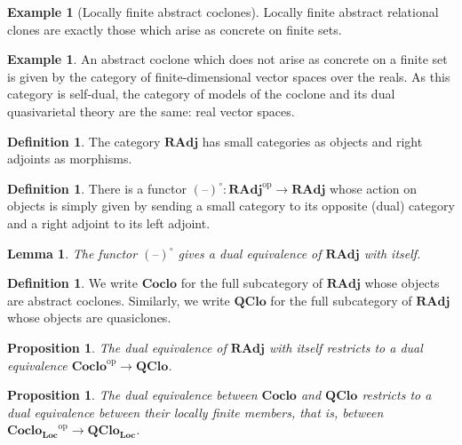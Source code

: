 \documentclass[11pt, a4paper, twoside,leqno]{amsart}
\newcommand{\cat}[1]{\mathbf{#1}}
\newcommand{\thg}{{\mathord{\text{--}}}}
\numberwithin{equation}{section}
\theoremstyle{plain}
\newtheorem{Prop}[Thm]{Proposition}
\newtheorem{Lemma}[Thm]{Lemma}
\theoremstyle{definition}
\newtheorem{Defn}[Thm]{Definition}
\newtheorem{Ex}[Thm]{Example}
\begin{document}
\begin{Ex}[Locally finite abstract coclones]
  \label{ex:loc-fin-arc}
  Locally finite abstract relational clones are exactly those which
  arise as concrete on finite sets. 
\end{Ex}

\begin{Ex}%
  \label{ex:vector-space}
  An abstract coclone which does not arise as 
  concrete on a finite set is given by the category
  of finite-dimensional vector spaces over the reals. As this category
  is self-dual, the category of models of the coclone and its
  dual quasivarietal theory are the same: real vector spaces. 
\end{Ex}


\begin{Defn}
  \label{def:rad-cat}
  The category \(\cat{RAdj}\) has small categories as objects and right
  adjoints as morphisms.
\end{Defn}

\begin{Defn}
  \label{def:func-o}
  There is a functor \((\thg)^{\circ} \colon \cat{RAdj} ^{\mathrm{op}} \rightarrow \cat{RAdj}\) whose
  action on objects is simply given by sending a small category to its
  opposite (dual) category and a right adjoint to its left adjoint.
\end{Defn}

\begin{Lemma}
  \label{lem:12}
  The functor \((\thg)^{\circ}\) gives a dual equivalence of \(\cat{RAdj}\) with itself.
\end{Lemma}

\begin{Defn}
  \label{def:subcats-radj}
  We write \(\cat{Coclo}\) for the full subcategory of \(\cat{RAdj}\)
  whose objects are abstract coclones. Similarly, we write
  \(\cat{QClo}\) for the full subcategory of \(\cat{RAdj}\)
  whose objects are quasiclones.
\end{Defn}

\begin{Prop}
  \label{prop:2}
  The dual equivalence of \(\cat{RAdj}\) with itself restricts to a dual
  equivalence \(\cat{Coclo}^{\mathrm{op}} \rightarrow
  \cat{QClo}\).
\end{Prop}

\begin{Prop}
  \label{prop:4}
  The dual equivalence between \(\cat{Coclo}\) and \(\cat{QClo}\) restricts to a dual
  equivalence between their locally finite members, that is, between \(\cat{Coclo_{Loc}}^{\mathrm{op}} \rightarrow \cat{QClo_{Loc}}\).
\end{Prop}
\end{document}
